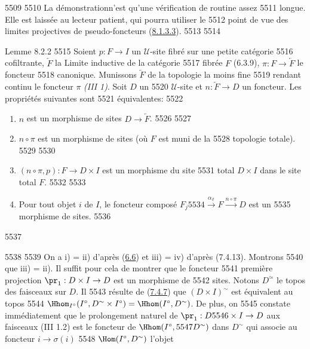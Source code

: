  5509	
  5510	La démonstration\pageoriginale n'est qu'une vérification de routine assez
  5511	longue. Elle est laissée au lecteur patient, qui pourra utiliser le
  5512	point de vue des limites projectives de pseudo-foncteurs (\hyperref[VI.par8.1.3.3]{8.1.3.3}).
  5513	
  5514	\begin{enonce*}{Lemme 8.2.2}
  5515	Soient $p : F \to I$ un $𝒰$-site fibré sur une petite catégorie
  5516	cofiltrante, $\underleftarrow{F}$ la Limite inductive de la catégorie
  5517	fibrée $F$ (6.3.9), $\pi : F \to \underleftarrow{F}$ le foncteur
  5518	canonique. Munissons $\underleftarrow{F}$ de la topologie la moins fine
  5519	rendant continu le foncteur $\pi$ \emph{(III 1)}. Soit $D$ un
  5520	$𝒰$-site et $n : \underleftarrow{F} \to D$ un foncteur. Les propriétés suivantes sont
  5521	équivalentes:
  5522	\begin{enumerate}
  5523	\renewcommand{\theenumi}{\roman{enumi}}
  5524	\renewcommand{\labelenumi}{\theenumi)}
  5525	\item $n$ est un morphisme de sites $D \to \underleftarrow{F}$.
  5526	
  5527	\item $n \circ \pi$ est un morphisme de sites (où $F$ est muni de la
  5528	  topologie totale).
  5529	
  5530	\item $(n \circ \pi, p) :  F \to D \times I$ est un morphisme du site
  5531	  total $D \times I$ dans le site total $F$.
  5532	
  5533	\item Pour tout objet $i$ de $I$, le foncteur composé $F_j
  5534	  \xrightarrow{\alpha_{i!}} F \xrightarrow{n \circ \pi} D$ est un
  5535	  morphisme de sites.
  5536	\end{enumerate}
  5537	\end{enonce*}
  5538	
  5539	On a i) = ii) d'après (\hyperref[VI.exe6.6]{6.6}) et iii) = iv) d'après (7.4.13). Montrons
  5540	que iii) = ii). Il suffit pour cela de montrer que le foncteur
  5541	première projection $\pr_1 : D \times I \to D$ est un morphisme de
  5542	sites. Notons $D^{\simeq}$ le topos des faisceaux sur $D$. Il
  5543	résulte de (\hyperref[VI.prop7.4.7]{7.4.7}) que $(D \times I)^{\sim}$ est équivalent au topos
  5544	$\Hhom_{I^{\circ}} (I^{\circ}, D^{\sim} \times I^{\circ}) = \Hhom(I^{\circ}, D^{\sim})$. De plus, on
  5545	constate immédiatement que le prolongement naturel de $\pr_1 : D
  5546	\times I \to D$ aux faisceaux (III 1.2) est le foncteur de $\Hhom(I^{\circ},
  5547	D^{\sim})$ dans $D^{\sim}$ qui associe au foncteur $i \to \sigma(i)$
  5548	$\Hom(I^{\circ}, D^{\sim})$ l'objet

